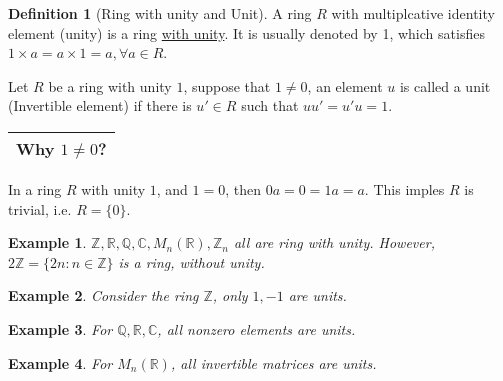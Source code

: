 \documentclass{article}
\theoremstyle{MyNonumberplain}
\theoremstyle{break}
\theoremstyle{break}
\newtheorem{example}{Example}[section]
\theoremstyle{break}
\theoremstyle{definition}
\theoremstyle{break}
\newtheorem{definition}{Definition}[section]
\begin{document}
\begin{defbox}
    \begin{definition}[Ring with unity and Unit]
        A ring $R$ with multiplcative identity element (unity) is a ring
        {\underline{with unity}}. It is usually denoted by 1, which satisfies $1
        \times a = a \times 1 = a, \forall a \in R$.\bigskip
        
        Let $R$ be a ring with unity $1$, suppose that $1 \neq 0$, an element $u$ is
        called a unit (Invertible element) if there is $u' \in R$ such that $u u' = u'
        u = 1$.\bigskip
        
        \begin{tabular}{|c|}
          \hline
          Why $1 \neq 0$?\\
          \hline
        \end{tabular}\bigskip
        
        In a ring $R$ with unity $1$, and $1 = 0$, then $0 a = 0 = 1 a = a$. This
        imples $R$ is trivial, i.e. $R = \{ 0 \}$.
    \end{definition}
\end{defbox}

\begin{expbox}
    \begin{example}
        $\mathbb{Z}, \mathbb{R}, \mathbb{Q}, \mathbb{C}, M_n (\mathbb{R}),
        \mathbb{Z}_n$ all are ring with unity. However, $2\mathbb{Z}= \{ 2 n : n \in
        \mathbb{Z} \}$ is a ring, without unity.
    \end{example}
\end{expbox}

\begin{expbox}
    \begin{example}
        Consider the ring $\mathbb{Z}$, only $1, - 1$ are units.
    \end{example}
\end{expbox}

\begin{expbox}
    \begin{example}
        For $\mathbb{Q}, \mathbb{R}, \mathbb{C}$, all nonzero elements are units.
    \end{example}
\end{expbox}

\begin{expbox}
    \begin{example}
        For $M_n (\mathbb{R})$, all invertible matrices are units.
    \end{example}
\end{expbox}
\end{document}
